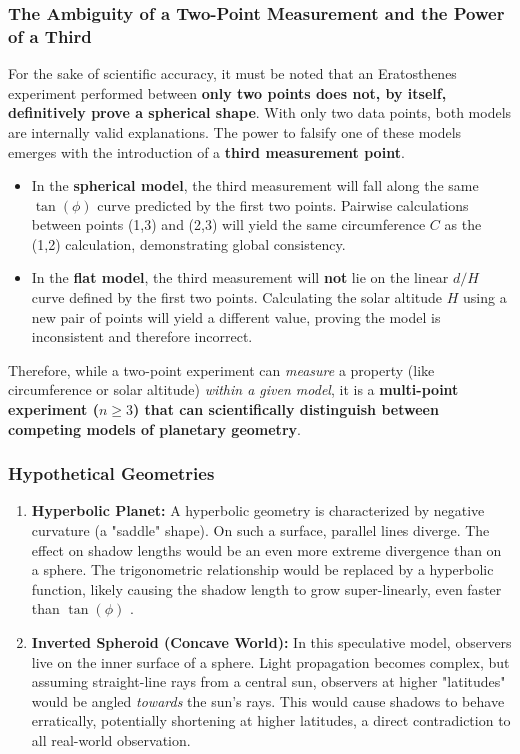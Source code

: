 \documentclass[11pt]{article}
\begin{document}
\subsubsection{The Ambiguity of a Two-Point Measurement and the Power of a Third}
For the sake of scientific accuracy, it must be noted that an Eratosthenes experiment performed between \textbf{only two points does not, by itself, definitively prove a spherical shape}. With only two data points, both models are internally valid explanations. The power to falsify one of these models emerges with the introduction of a \textbf{third measurement point}.
\begin{itemize}
    \item In the \textbf{spherical model}, the third measurement will fall along the same $\tan(\phi)$ curve predicted by the first two points. Pairwise calculations between points (1,3) and (2,3) will yield the same circumference $C$ as the (1,2) calculation, demonstrating global consistency.
    \item In the \textbf{flat model}, the third measurement will \textbf{not} lie on the linear $d/H$ curve defined by the first two points. Calculating the solar altitude $H$ using a new pair of points will yield a different value, proving the model is inconsistent and therefore incorrect.
\end{itemize}
Therefore, while a two-point experiment can \textit{measure} a property (like circumference or solar altitude) \textit{within a given model}, it is a \textbf{multi-point experiment ($n \ge 3$) that can scientifically distinguish between competing models of planetary geometry}.

\subsubsection{Hypothetical Geometries}
\begin{enumerate}
    \item  \textbf{Hyperbolic Planet:} A hyperbolic geometry is characterized by negative curvature (a "saddle" shape). On such a surface, parallel lines diverge. The effect on shadow lengths would be an even more extreme divergence than on a sphere. The trigonometric relationship would be replaced by a hyperbolic function, likely causing the shadow length to grow super-linearly, even faster than $\tan(\phi)$ \cite{Richards1997}.
    \item  \textbf{Inverted Spheroid (Concave World):} In this speculative model, observers live on the inner surface of a sphere. Light propagation becomes complex, but assuming straight-line rays from a central sun, observers at higher "latitudes" would be angled \textit{towards} the sun's rays. This would cause shadows to behave erratically, potentially shortening at higher latitudes, a direct contradiction to all real-world observation.
\end{enumerate}
\end{document}
